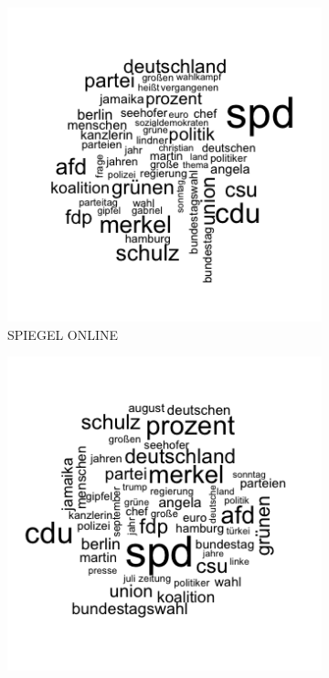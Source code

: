 \documentclass[12pt,a4paper,notitlepage]{article}
\begin{document}
\begin{figure}[H]
\begin{center}
\begin{subfigure}[normla]{0.43\textwidth}
			\includegraphics[width=\textwidth]{figs/wordcloud_SPIEGELONLINE.png}
			\caption{SPIEGEL ONLINE}
		\end{subfigure}
		\begin{subfigure}[normla]{0.43\textwidth}
			\includegraphics[width=\textwidth]{figs/wordcloud_stern.png}

\end{subfigure}
\end{center}
\end{figure}
\end{document}
